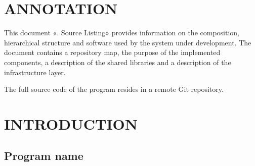 \documentclass[12pt,a4paper]{extarticle}
\begin{document}
\sloppy






\section*{ANNOTATION}

This document «\projectname. Source Listing» provides information on the composition, hierarchical structure and software used by the system under development. The document contains a repository map, the purpose of the implemented components, a description of the shared libraries and a description of the infrastructure layer.

The full source code of the program resides in a remote Git repository. 

\clearpage

\hypersetup{linkcolor=black}
\tableofcontents
\hypersetup{linkcolor=blue}
\thispagestyle{fancy}
\clearpage

\section{INTRODUCTION}

\subsection{Program name}
\end{document}

